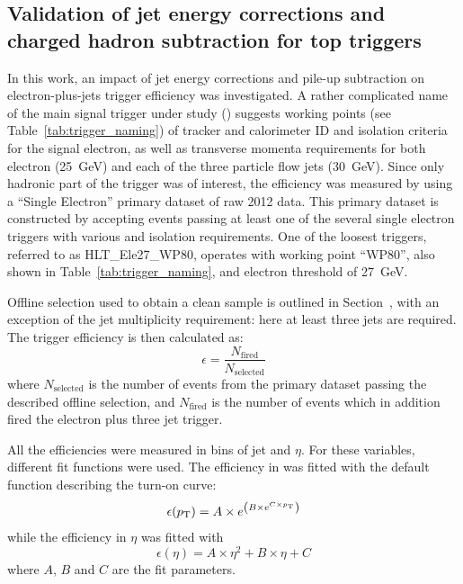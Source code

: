 
\subsection{Validation of jet energy corrections and charged hadron subtraction for top triggers}
\label{ss:JEC_PFnoPU_validation}

In this work, an impact of jet energy corrections and pile-up subtraction on electron-plus-jets trigger efficiency was
investigated. A rather complicated name of the main signal trigger under study (\HLTThreeCentralPFJet) suggests working
points (see Table~\ref{tab:trigger_naming}) of tracker and calorimeter ID and isolation criteria for the signal
electron, as well as transverse momenta requirements for both electron (\SI{25}{\GeV}) and each of the three particle
flow jets (\SI{30}{\GeV}). Since only hadronic part of the trigger was of interest, the efficiency was measured by using
a ``Single Electron'' primary dataset of raw 2012 data. This primary dataset is constructed by accepting events passing
at least one of the several single electron triggers with various \pt and isolation requirements. One of the loosest
triggers, referred to as HLT\_Ele27\_WP80, operates with working point ``WP80'', also shown in
Table~\ref{tab:trigger_naming}, and electron \pt threshold of \SI{27}{\GeV}.

Offline selection used to obtain a clean \ttbar sample is outlined in Section~\cite{ss:event_selection}, with an
exception of the jet multiplicity requirement: here at least three jets are required. The trigger efficiency is then
calculated as:
\begin{equation}
\epsilon = \frac{N_{\text{fired}}}{N_{\text{selected}}}
\end{equation}
where $N_{\text{selected}}$ is the number of events from the primary dataset passing the described offline selection,
and $N_{\text{fired}}$ is the number of events which in addition fired the electron plus three jet trigger.

All the efficiencies were measured in bins of jet \pt and $\eta$. For these variables, different fit functions were
used. The efficiency in \pt was fitted with the default function describing the turn-on curve:
\begin{equation}
\epsilon(p_{\mathrm{T}}) = A \times e^{\left(B \times e^{C \times p_{\mathrm{T}}}\right)}
\end{equation}
while the efficiency in $\eta$ was fitted with
\begin{equation}
\epsilon (\eta) = A \times \eta^2 + B \times \eta + C
\end{equation}
where $A$, $B$ and $C$ are the fit parameters.

